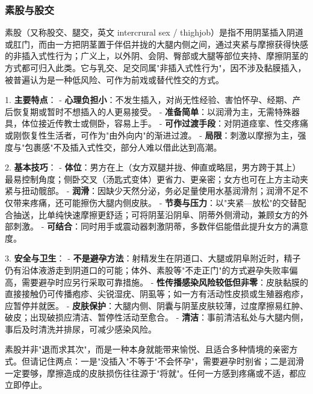 \subsubsection{素股与股交}

素股（又称股交、腿交，英文 intercrural sex / thighjob）是指不用阴茎插入阴道或肛门，而由一方把阴茎置于伴侣并拢的大腿内侧之间，通过夹紧与摩擦获得快感的非插入式性行为；广义上，以外阴、会阴、臀部或大腿等部位夹持、摩擦阴茎的方式都可归入此类。它与乳交、足交同属"非插入式性行为"，因不涉及黏膜插入，被普遍认为是一种低风险、可作为前戏或替代性交的方式。

1. \textbf{主要特点}：
   - \textbf{心理负担小}：不发生插入，对尚无性经验、害怕怀孕、经期、产后恢复期或暂时不想插入的人更易接受。
   - \textbf{准备简单}：以润滑为主，无需特殊器具，体位接近传教士或侧卧，容易上手。
   - \textbf{可作过渡手段}：对阴道痉挛、性交疼痛或刚恢复性生活者，可作为"由外向内"的渐进过渡。
   - \textbf{局限}：刺激以摩擦为主，强度与"包裹感"不及插入式性交，部分人难以借此达到高潮。

2. \textbf{基本技巧}：
   - \textbf{体位}：男方在上（女方双腿并拢、伸直或略屈，男方跨于其上）最易控制角度；侧卧交叉（汤匙式变体）更省力、更亲密；女方也可在上方主动夹紧与扭动髋部。
   - \textbf{润滑}：因缺少天然分泌，务必足量使用水基润滑剂；润滑不足不仅带来疼痛，还可能擦伤大腿内侧皮肤。
   - \textbf{节奏与压力}：以"夹紧—放松"的交替配合抽送，比单纯快速摩擦更舒适；可将阴茎沿阴阜、阴蒂外侧滑动，兼顾女方的外部刺激。
   - \textbf{可结合}：同时用手或震动器刺激阴蒂，多数伴侣能借此提升女方的满意度。

3. \textbf{安全与卫生}：
   - \textbf{不是避孕方法}：射精发生在阴道口、大腿或阴阜附近时，精子仍有沿体液游走到阴道口的可能；体外、素股等"不走正门"的方式避孕失败率偏高，需要避孕时应另行采取可靠措施。
   - \textbf{性传播感染风险较低但非零}：皮肤黏膜的直接接触仍可传播疱疹、尖锐湿疣、阴虱等；如一方有活动性皮损或生殖器疱疹，应暂停并就医。
   - \textbf{皮肤保护}：大腿内侧、阴囊与阴茎皮肤较薄，过度摩擦易红肿、破皮；出现破损应清洁、暂停性活动至愈合。
   - \textbf{清洁}：事前清洁私处与大腿内侧，事后及时清洗并排尿，可减少感染风险。

\begin{tcolorbox}[colback=pink!5!white,colframe=red!50!black,title=贴心小叮咛]
素股并非"退而求其次"，而是一种本身就能带来愉悦、且适合多种情境的亲密方式。但请记住两点：一是"没插入"不等于"不会怀孕"，需要避孕时别省；二是润滑一定要够，摩擦造成的皮肤损伤往往源于"将就"。任何一方感到疼痛或不适，都应立即停止。
\end{tcolorbox}